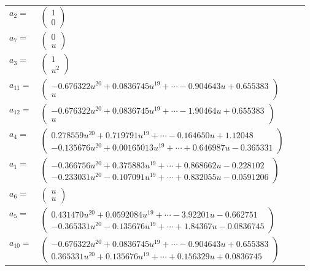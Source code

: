 \documentclass[1p]{elsarticle_modified}
\theoremstyle{definition}
\begin{document}
\begin{tabular}{m{7pt} m{180pt} m{7pt} m{180pt} }
\flushright $a_{2}=$&$\begin{pmatrix}1\\0\end{pmatrix}$ \\
\flushright $a_{7}=$&$\begin{pmatrix}0\\u\end{pmatrix}$ \\
\flushright $a_{3}=$&$\begin{pmatrix}1\\u^2\end{pmatrix}$ \\
\flushright $a_{11}=$&$\begin{pmatrix}-0.676322 u^{20}+0.0836745 u^{19}+\cdots-0.904643 u+0.655383\\u\end{pmatrix}$ \\
\flushright $a_{12}=$&$\begin{pmatrix}-0.676322 u^{20}+0.0836745 u^{19}+\cdots-1.90464 u+0.655383\\u\end{pmatrix}$ \\
\flushright $a_{4}=$&$\begin{pmatrix}0.278559 u^{20}+0.719791 u^{19}+\cdots-0.164650 u+1.12048\\-0.135676 u^{20}+0.00165013 u^{19}+\cdots+0.646987 u-0.365331\end{pmatrix}$ \\
\flushright $a_{1}=$&$\begin{pmatrix}-0.366756 u^{20}+0.375883 u^{19}+\cdots+0.868662 u-0.228102\\-0.233031 u^{20}-0.107091 u^{19}+\cdots+0.832055 u-0.0591206\end{pmatrix}$ \\
\flushright $a_{6}=$&$\begin{pmatrix}u\\u\end{pmatrix}$ \\
\flushright $a_{5}=$&$\begin{pmatrix}0.431470 u^{20}+0.0592084 u^{19}+\cdots-3.92201 u-0.662751\\-0.365331 u^{20}-0.135676 u^{19}+\cdots+1.84367 u-0.0836745\end{pmatrix}$ \\
\flushright $a_{10}=$&$\begin{pmatrix}-0.676322 u^{20}+0.0836745 u^{19}+\cdots-0.904643 u+0.655383\\0.365331 u^{20}+0.135676 u^{19}+\cdots+0.156329 u+0.0836745\end{pmatrix}$ \\

\end{tabular}
\end{document}
